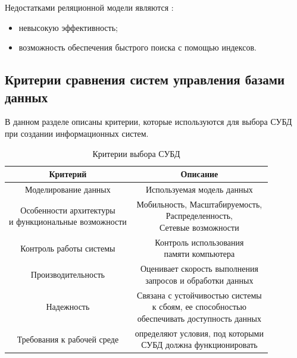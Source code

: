 Недостатками реляционной модели являются \cite{instument}:
\begin{itemize}
	\item невысокую эффективность;
	\item возможность обеспечения быстрого поиска с помощью индексов.
\end{itemize}

\subsection{Критерии сравнения систем управления базами данных}

В данном разделе описаны критерии, которые используются для выбора
СУБД при создании информационных систем.

\begin{table}[h]
	\begin{center}
		\begin{threeparttable}
			\captionsetup{justification=raggedright,singlelinecheck=off}
			\caption{Критерии выбора СУБД \cite{one}}
			\label{tbl:time_even}
			\begin{tabular}{|c|c|}
				\hline
				Критерий & Описание\\
				\hline Моделирование данных & Используемая модель данных\\	
				\hline \makecell{Особенности архитектуры \\ и функциональные возможности} & \makecell{Мобильность, Масштабируемость, \\Распределенность, \\Сетевые возможности}\\
				\hline Контроль работы системы & \makecell{Контроль использования \\ памяти компьютера}\\
				\hline Производительность & \makecell{Оценивает скорость выполнения\\запросов и обработки данных}\\
				\hline Надежность & \makecell{Связана с устойчивостью системы\\к сбоям, ее способностью \\обеспечивать доступность данных}\\
				\hline Требования к рабочей среде & \makecell{определяют условия, под которыми\\ СУБД должна функционировать}\\\hline
			\end{tabular}
		\end{threeparttable}
	\end{center}
\end{table}
\clearpage
